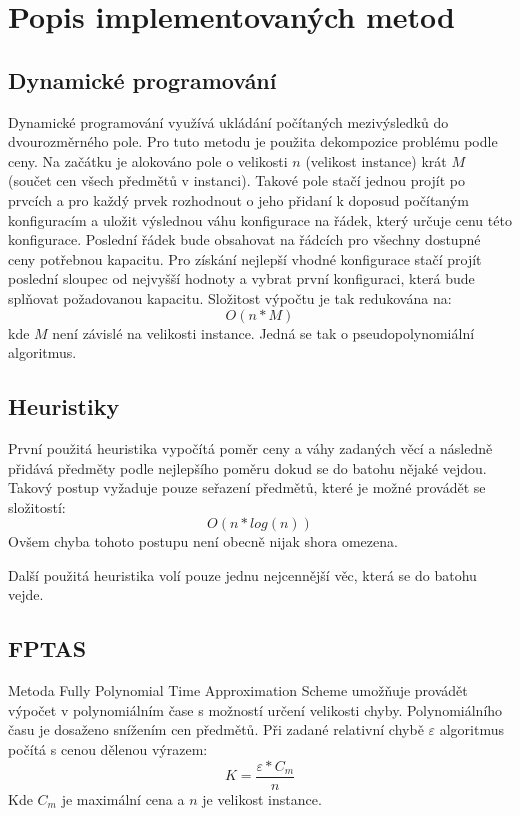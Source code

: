 \documentclass[12pt]{article}
\begin{document}
   		
   		
	\section{Popis implementovaných metod}\label{met}
		\subsection{Dynamické programování}\label{dp}
			Dynamické programování využívá ukládání počítaných mezivýsledků do dvourozměrného pole. Pro tuto metodu je použita dekompozice problému podle ceny. Na začátku je alokováno pole o velikosti $n$ (velikost instance) krát $M$ (součet cen všech předmětů v instanci). Takové pole stačí jednou projít  po prvcích a pro každý prvek rozhodnout o jeho přidaní k doposud počítaným konfiguracím a uložit výslednou váhu konfigurace na řádek, který určuje cenu této konfigurace. Poslední řádek bude obsahovat na řádcích pro všechny dostupné ceny potřebnou kapacitu. Pro získání nejlepší vhodné konfigurace stačí projít poslední sloupec od nejvyšší hodnoty a vybrat první konfiguraci, která bude splňovat požadovanou kapacitu. Složitost výpočtu je tak redukována na: \[ O(n * M)\] kde $M$ není závislé na velikosti instance. Jedná se tak o pseudopolynomiální algoritmus.
		
		
		\subsection{Heuristiky}
			První použitá heuristika vypočítá poměr ceny a váhy zadaných věcí a následně přidává předměty podle nejlepšího poměru dokud se do batohu nějaké vejdou. Takový postup vyžaduje pouze seřazení předmětů, které je možné provádět se složitostí: \[ O(n * log(n))\] Ovšem chyba tohoto postupu není obecně nijak shora omezena.
			
			Další použitá heuristika volí pouze jednu nejcennější věc, která se do batohu vejde.
			
			
		\subsection{FPTAS}\label{fptas}
			Metoda Fully Polynomial Time Approximation Scheme umožňuje provádět výpočet v polynomiálním čase s možností určení velikosti chyby. Polynomiálního času je dosaženo snížením cen předmětů. Při zadané relativní chybě $\varepsilon$ algoritmus počítá s cenou dělenou výrazem: \[K = \dfrac{\varepsilon * C_m}{n} \] Kde $C_m$ je maximální cena a $n$ je velikost instance.
			
\end{document}
